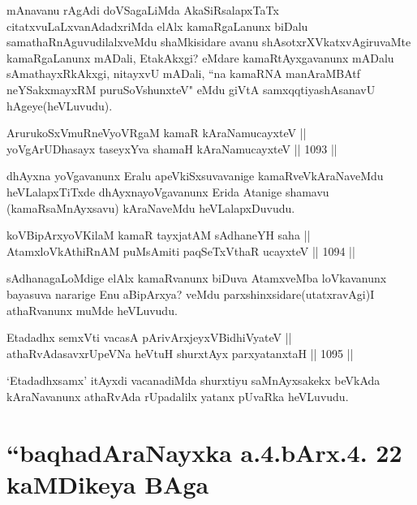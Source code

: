 \begin{artha}
mAnavanu rAgAdi doVSagaLiMda AkaSiRsalapxTaTx citatxvuLaLxvanAdadxriMda elAlx kamaRgaLanunx biDalu samathaRnAguvudilalxveMdu shaMkisidare avanu shAsotxrXVkatxvAgiruvaMte kamaRgaLanunx mADali, EtakAkxgi? eMdare kamaRtAyxgavanunx mADalu sAmathayxRkAkxgi, nitayxvU mADali, ``na kamaRNA manAraMBAtf neYSakxmayxRM puruSoV\s shunxteV" eMdu giVtA samxqqtiyashAsanavU hAgeye(heVLuvudu).
\end{artha}

\begin{shl}
ArurukoSxVmuRneVyoVRgaM kamaR kAraNamucayxteV || \\
yoVgArUDhasayx taseyxYva shamaH kAraNamucayxteV ||  1093 ||  
\end{shl}

\begin{artha}
dhAyxna yoVgavanunx Eralu apeVkiSxsuvavanige kamaRveVkAraNaveMdu heVLalapxTiTxde dhAyxnayoVgavanunx Erida Atanige shamavu (kamaRsaMnAyxsavu) kAraNaveMdu heVLalapxDuvudu.
\end{artha}


\begin{shl}
koV\s BipArxyoV\s KilaM kamaR tayxjatAM sAdhaneYH saha || \\
AtamxloVkAthiRnAM puMsAmiti paqSeTxV\s thaR ucayxteV ||  1094 ||
\end{shl}

\begin{artha}
sAdhanagaLoMdige elAlx kamaRvanunx biDuva AtamxveMba loVkavanunx bayasuva nararige Enu aBipArxya? veMdu parxshinxsidare(utatxravAgi)I athaRvanunx muMde heVLuvudu.
\end{artha}

\begin{shl}
Etadadhx semxVti vacasA pArivArxjeyxV\s BidhiVyateV || \\
athaRvAdasavxrUpeVNa heVtuH shurxtAyx parxyatanxtaH ||  1095 ||  
\end{shl}

\begin{artha}
`Etadadhxsamx' itAyxdi vacanadiMda shurxtiyu saMnAyxsakekx beVkAda kAraNavanunx athaRvAda rUpadalilx yatanx pUvaRka heVLuvudu.
\end{artha}

\section*{``baqhadAraNayxka a.4.bArx.4. 22 kaMDikeya BAga}


